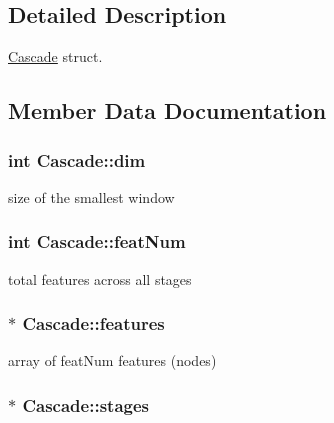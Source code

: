 \subsection{Detailed Description}
\hyperlink{structCascade}{Cascade} struct. 

\subsection{Member Data Documentation}
\hypertarget{structCascade_a484a13a96ae784166f514e6fe286a2ad}{}
\subsubsection[{dim}]{\setlength{\rightskip}{0pt plus 5cm}int Cascade\+::dim}\label{structCascade_a484a13a96ae784166f514e6fe286a2ad}


size of the smallest window 

\hypertarget{structCascade_a71fcccb274955fbde7d5969499688c88}{}
\subsubsection[{feat\+Num}]{\setlength{\rightskip}{0pt plus 5cm}int Cascade\+::feat\+Num}\label{structCascade_a71fcccb274955fbde7d5969499688c88}


total features across all stages 

\hypertarget{structCascade_a07cf0273b40c3698e86e221a44950f18}{}
\subsubsection[{features}]{$\ast$ Cascade\+::features}\label{structCascade_a07cf0273b40c3698e86e221a44950f18}


array of feat\+Num features (nodes) 

\hypertarget{structCascade_a65e890448add25c5ef1b8e532fb0abf0}{}
\subsubsection[{stages}]{$\ast$ Cascade\+::stages}\label{structCascade_a65e890448add25c5ef1b8e532fb0abf0}


